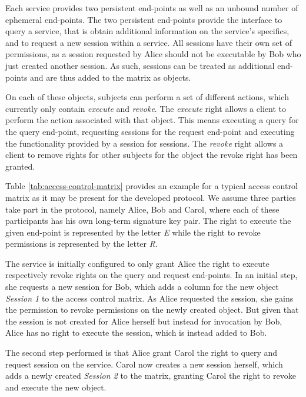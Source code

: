 Each service provides two persistent end-points as well as an unbound number of ephemeral end-points.
The two persistent end-points provide the interface to query a service, that is obtain additional information on the service's specifics, and to request a new session within a service.
All sessions have their own set of permissions, as a session requested by Alice should not be executable by Bob who just created another session.
As such, sessions can be treated as additional end-points and are thus added to the matrix as objects.

On each of these objects, subjects can perform a set of different actions, which currently only contain \emph{execute} and \emph{revoke}.
The \emph{execute} right allows a client to perform the action associated with that object.
This means executing a query for the query end-point, requesting sessions for the request end-point and executing the functionality provided by a session for sessions.
The \emph{revoke} right allows a client to remove rights for other subjects for the object the revoke right has been granted.

Table \ref{tab:access-control-matrix} provides an example for a typical access control matrix as it may be present for the developed protocol.
We assume three parties take part in the protocol, namely Alice, Bob and Carol, where each of these participants has his own long-term signature key pair.
The right to execute the given end-point is represented by the letter \emph{E} while the right to revoke permissions is represented by the letter \emph{R}.

The service is initially configured to only grant Alice the right to execute respectively revoke rights on the query and request end-points.
In an initial step, she requests a new session for Bob, which adds a column for the new object \emph{Session 1} to the access control matrix.
As Alice requested the session, she gains the permission to revoke permissions on the newly created object.
But given that the session is not created for Alice herself but instead for invocation by Bob, Alice has no right to execute the session, which is instead added to Bob.

The second step performed is that Alice grant Carol the right to query and request session on the service.
Carol now creates a new session herself, which adds a newly created \emph{Session 2} to the matrix, granting Carol the right to revoke and execute the new object.

